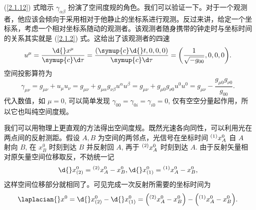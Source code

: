 \documentclass[UTF8, 12pt, a4paper, oneside, onecolumn, fontset=none]{ctexart}
\begin{document}
(\ref{2.1.12}) 式暗示 $\gamma_{\alpha\beta}$ 扮演了空间度规的角色。我们可以验证一下。对于一个观测者，他应该会倾向于采用相对于他静止的坐标系进行观测。反过来讲，给定一个坐标系，考虑一个相对坐标系随动的观测者。该观测者随身携带的钟走时与坐标时间的关系其实就是 (\ref{2.1.2}) 式。这给出了该观测者的四速
\begin{equation}
u^{\mu}=\frac{\d{}x^{\mu}}{\symup{c}\d\tau}=\frac{\mleft(\symup{c}\d{}t, 0, 0, 0\mright)}{\symup{c}\d\tau}=\mleft(\frac{1}{\sqrt{-g_{00}}}, 0, 0, 0\mright).
\end{equation}
空间投影算符为
\begin{equation}
\gamma_{\mu\nu}=g_{\mu\nu}+u_{\mu}u_{\nu}=g_{\mu\nu}+g_{\mu\alpha}g_{\nu\beta}u^{\alpha}u^{\beta}=g_{\mu\nu}+g_{\mu0}g_{\nu0}u^{0}u^{0}=g_{\mu\nu}-\frac{g_{\mu0}g_{\nu0}}{g_{00}}.
\end{equation}
代入数值，如 $\mu=0$, 可以简单发现 $\gamma_{00}=\gamma_{0i}=\gamma_{i0}=0$, 仅有空空分量起作用，所以它也叫纯空间度规。

我们可以用物理上更直观的方法得出空间度规。既然光速各向同性，可以利用光在两点间的反射测距。假设 $A, B$ 为空间的两邻点，光信号在坐标时间 ${}^{\mleft(1\mright)}x_{A}^{0}$ 自 $A$ 射向 $B$, 在 $x_{B}^{0}$ 时刻到达 $B$ 并反射回 $A$, 再于 ${}^{\mleft(2\mright)}x_{A}^{0}$ 时刻到达 $A$. 由于反射矢量相对原矢量空间位移取反，不妨统一记
\begin{equation}
\d{}x^{0}_{\mleft(2\mright)}={}^{\mleft(2\mright)}x_{A}^{0}-x_{B}^{0},\d{}x^{0}_{\mleft(1\mright)}={}^{\mleft(1\mright)}x_{A}^{0}-x_{B}^{0},
\end{equation}
这样空间位移部分就相同了。可见完成一次反射所需要的坐标时间为
\begin{equation}
\laplacian{}x^{0}=\d{}x^{0}_{\mleft(2\mright)}-\d{}x^{0}_{\mleft(1\mright)}=\mleft({}^{\mleft(2\mright)}x_{A}^{0}-x^{0}_{B}\mright)-\mleft({}^{\mleft(1\mright)}x_{A}^{0}-x^{0}_{B}\mright).
\end{equation}
\end{document}
